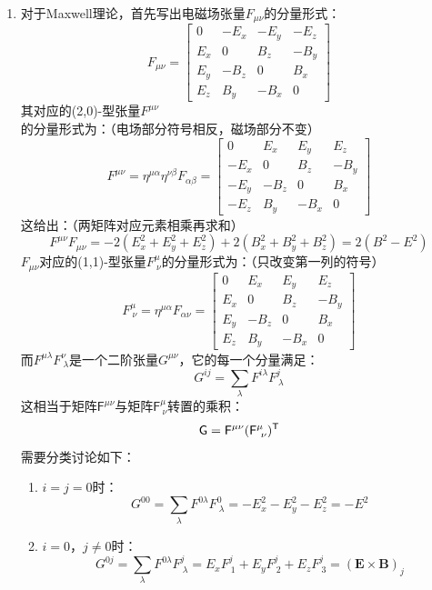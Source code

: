 \documentclass[a4paper]{article}
\newcommand{\trans}{\text{\textsf{T}}}
\begin{document}
\begin{enumerate}
    \bigskip
    \item[11.(a)]
    对于Maxwell理论，首先写出电磁场张量$F_{\mu\nu}$的分量形式：
    \[
        F_{\mu\nu} =
        \begin{bmatrix}
        0 & -E_x & -E_y & -E_z \\
        E_x & 0 & B_z & -B_y \\
        E_y & -B_z & 0 & B_x \\
        E_z & B_y & -B_x & 0
        \end{bmatrix}
    \]
    其对应的(2,0)-型张量$F^{\mu\nu}$的分量形式为：（电场部分符号相反，磁场部分不变）
    \[
        F^{\mu\nu} = \eta^{\mu\alpha} \eta^{\nu\beta} F_{\alpha\beta} =
        \begin{bmatrix}
        0 & E_x & E_y & E_z \\
        -E_x & 0 & B_z & -B_y \\
        -E_y & -B_z & 0 & B_x \\
        -E_z & B_y & -B_x & 0
        \end{bmatrix}
    \]
    这给出：（两矩阵对应元素相乘再求和）
    \[
        F^{\mu\nu} F_{\mu\nu} = -2(E_x^2 + E_y^2 + E_z^2) + 2(B_x^2 + B_y^2 + B_z^2) = 2(B^2 - E^2)
    \]
    $F_{\mu\nu}$对应的(1,1)-型张量$F^\mu_{\ \nu}$的分量形式为：（只改变第一列的符号）
    \[
        F^\mu_{\ \nu} = \eta^{\mu\alpha} F_{\alpha\nu} =
        \begin{bmatrix}
        0 & E_x & E_y & E_z \\
        E_x & 0 & B_z & -B_y \\
        E_y & -B_z & 0 & B_x \\
        E_z & B_y & -B_x & 0
        \end{bmatrix}
    \]
    而$F^{\mu\lambda} F^\nu_{\ \lambda}$是一个二阶张量$G^{\mu\nu}$，它的每一个分量满足：
    \[
        G^{ij} = \sum_\lambda F^{i\lambda} F^j_{\ \lambda}
    \]
    这相当于矩阵$\mathsf{F^{\mu\nu}}$与矩阵$\mathsf{F^\mu_{\ \nu}}$转置的乘积：
    \[
        \mathsf{G} = \mathsf{F^{\mu\nu} (F^\mu_{\ \nu})^\trans}
    \]
    需要分类讨论如下：
    \begin{enumerate}
        \item[(1)]
        $i = j = 0$时：
        \[
            G^{00} = \sum_\lambda F^{0\lambda} F^0_{\ \lambda} = -E_x^2 - E_y^2 - E_z^2 = -E^2
        \]
        \item[(2)]
        $i = 0$，$j \neq 0$时：
        \[
            G^{0j} = \sum_\lambda F^{0\lambda} F^j_{\ \lambda} = E_x F^j_{\ 1} + E_y F^j_{\ 2} + E_z F^j_{\ 3} = (\mathbf{E} \times \mathbf{B})_j
\]
\end{enumerate}
\end{enumerate}
\end{document}

